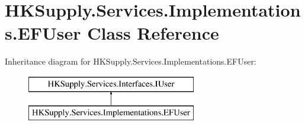 \hypertarget{class_h_k_supply_1_1_services_1_1_implementations_1_1_e_f_user}{}\section{H\+K\+Supply.\+Services.\+Implementations.\+E\+F\+User Class Reference}
\label{class_h_k_supply_1_1_services_1_1_implementations_1_1_e_f_user}
Inheritance diagram for H\+K\+Supply.\+Services.\+Implementations.\+E\+F\+User\+:\begin{figure}[H]
\begin{center}
\leavevmode
\includegraphics[height=2.000000cm]{class_h_k_supply_1_1_services_1_1_implementations_1_1_e_f_user}
\end{center}
\end{figure}
